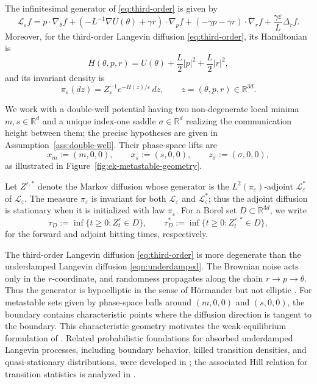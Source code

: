 \documentclass[11pt]{article}
\numberwithin{equation}{section}
\theoremstyle{plain}
\theoremstyle{definition}
\theoremstyle{remark}
\newcommand{\R}{\mathbb R}
\newcommand{\eps}{\varepsilon}
\newcommand{\calL}{\mathcal L}
\begin{document}
The infinitesimal generator of \eqref{eq:third-order} is given by
\begin{equation}
\label{eq:generator}
\calL_\eps f
=p\cdot\nabla_\theta f
+\left(-L^{-1}\nabla U(\theta)+\gamma r\right)\cdot\nabla_p f
+(-\gamma p-\gamma r)\cdot\nabla_r f
+\frac{\gamma\eps}{L}\Delta_r f.
\end{equation}
Moreover, for the third-order Langevin diffusion \eqref{eq:third-order}, its Hamiltonian is
\begin{equation}
\label{eq:Hamiltonian}
H(\theta,p,r)
=
U(\theta)+\frac L2|p|^2+\frac L2|r|^2,
\end{equation}
and its invariant density is
\begin{equation}
\label{eq:invariant-density}
\pi_\eps(dz)
=
Z_\eps^{-1}e^{-H(z)/\eps}\,dz,
\qquad z=(\theta,p,r)\in\R^{3d}.
\end{equation}

We work with a double-well potential having two non-degenerate local minima
$m,s\in\R^d$ and a unique index-one saddle $\sigma\in\R^d$ realizing the
communication height between them; the precise hypotheses are given in
Assumption~\ref{ass:double-well}.  Their
phase-space lifts are
\[
x_m:=(m,0,0),\qquad x_s:=(s,0,0),\qquad z_\sigma:=(\sigma,0,0),
\]
as illustrated in Figure~\ref{fig:ek-metastable-geometry}.

Let $Z^{\eps,*}$ denote the Markov diffusion whose generator is the
$L^2(\pi_\eps)$-adjoint $\calL_\eps^*$ of $\calL_\eps$.  The measure
$\pi_\eps$ is invariant for both $\calL_\eps$ and $\calL_\eps^*$; thus the
adjoint diffusion is stationary when it is initialized with law $\pi_\eps$.
For a Borel set
$D\subset\R^{3d}$, we write
\[
\tau_D:=\inf\{t\ge0:Z_t^\eps\in D\},
\qquad
\tau_D^*:=\inf\{t\ge0:Z_t^{\eps,*}\in D\},
\]
for the forward and adjoint hitting times, respectively.

The third-order Langevin diffusion \eqref{eq:third-order} is more degenerate than the underdamped Langevin diffusion \eqref{eqn:underdamped}.  The Brownian noise acts only in the $r$-coordinate, and randomness propagates along the chain $r\to p\to\theta$.  Thus the generator is hypoelliptic in the sense of H\"ormander but not elliptic \cite{Hormander1967}.  For metastable sets given by phase-space balls around $(m,0,0)$ and $(s,0,0)$, the boundary contains characteristic points where the diffusion direction is tangent to the boundary.  This characteristic geometry motivates the weak-equilibrium formulation of \cite{LeeRamilSeo2026,HeLiWangZhu2026WeakEquilibrium}.
Related probabilistic foundations for absorbed underdamped Langevin processes,
including boundary behavior, killed transition densities, and quasi-stationary
distributions, were developed in
\cite{LelievreRamilReygner2022KFP,LelievreRamilReygner2022QSD}; the associated
Hill relation for transition statistics is analyzed in
\cite{LelievreRamilReygner2022Hill}.
\end{document}
